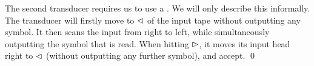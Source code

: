 \begin{example}

The second transducer requires us to use a \FFT{}. We will only describe
    this informally. The transducer will firstly move to $\vartriangleleft$ of the input tape
    without outputting any symbol. It then scans the input from
    right to left, while simultaneously outputting the symbol that is read.
    When hitting $\vartriangleright$, it moves its input head right to $\vartriangleleft$ (without outputting any further symbol), and accept.
    \qed
\end{example}



